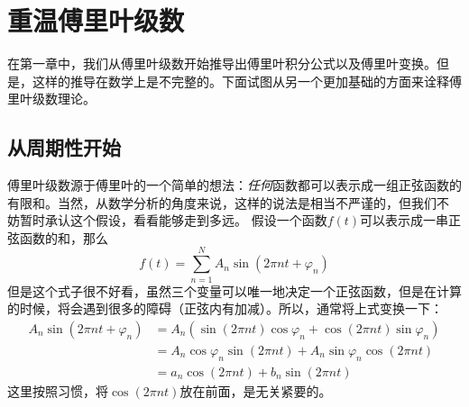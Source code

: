 \chapter{重温傅里叶级数}
    在第一章中，我们从傅里叶级数开始推导出傅里叶积分公式以及傅里叶变换。但是，这样的推导在数学上是不完整的。下面试图从另一个更加基础的方面来诠释傅里叶级数理论。
    \section{从周期性开始}
        傅里叶级数源于傅里叶的一个简单的想法：\emph{任何}函数都可以表示成一组正弦函数的有限和。当然，从数学分析的角度来说，这样的说法是相当不严谨的，但我们不%
        妨暂时承认这个假设，看看能够走到多远。
        假设一个函数$f(t)$可以表示成一串正弦函数的和，那么
        \begin{equation*}
            f(t) = \sum_{n = 1}^{N} A_n\sin(2\pi n t + \varphi_n)
        \end{equation*}
        但是这个式子很不好看，虽然三个变量可以唯一地决定一个正弦函数，但是在计算的时候，将会遇到很多的障碍（正弦内有加减）。所以，通常将上式变换一下：
        \begin{equation}
            \begin{split}
                A_n\sin(2\pi n t + \varphi_n) &= A_n(\sin(2\pi nt)\cos\varphi_n + \cos(2\pi nt)\sin\varphi_n)\\
                &= A_n\cos\varphi_n\sin(2\pi nt) + A_n\sin\varphi_n\cos(2\pi nt)\\
                &= a_n\cos(2\pi nt) + b_n\sin(2\pi nt)
            \end{split}
            \label{eq: 3.1}
        \end{equation}
        这里按照习惯，将$\cos(2\pi nt)$放在前面，是无关紧要的。

